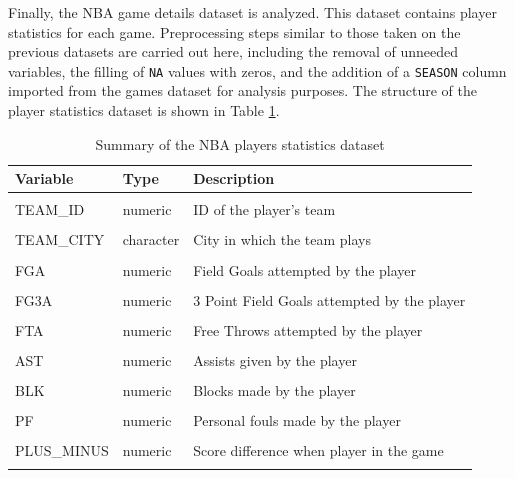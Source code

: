 \documentclass[
  12pt,
  a4paper,
]{article}
\begin{document}
Finally, the NBA game details dataset is analyzed. This dataset contains player statistics for each game. Preprocessing steps similar to those taken on the previous datasets are carried out here, including the removal of unneeded variables, the filling of \texttt{NA} values with zeros, and the addition of a \texttt{SEASON} column imported from the games dataset for analysis purposes. The structure of the player statistics dataset is shown in Table \ref{tab:gddesc}.

\begin{table}[H]

\caption{\label{tab:gddesc}Summary of the NBA players statistics dataset}
\centering
\begin{tabular}[t]{lll}
\toprule
Variable & Type & Description\\
\midrule
\cellcolor{gray!30}{GAME\_ID} & \cellcolor{gray!30}{numeric} & \cellcolor{gray!30}{NBA's game ID in their API}\\
TEAM\_ID & numeric & ID of the player's team\\
\cellcolor{gray!30}{TEAM\_ABBREVIATION} & \cellcolor{gray!30}{character} & \cellcolor{gray!30}{3-letter abbreviation of the team name}\\
TEAM\_CITY & character & City in which the team plays\\
\cellcolor{gray!30}{FGM} & \cellcolor{gray!30}{numeric} & \cellcolor{gray!30}{Field Goals made by the player}\\
FGA & numeric & Field Goals attempted by the player\\
\cellcolor{gray!30}{FG3M} & \cellcolor{gray!30}{numeric} & \cellcolor{gray!30}{3 Point Field Goals made by the player}\\
FG3A & numeric & 3 Point Field Goals attempted by the player\\
\cellcolor{gray!30}{FTM} & \cellcolor{gray!30}{numeric} & \cellcolor{gray!30}{Free Throws made by the player}\\
FTA & numeric & Free Throws attempted by the player\\
\cellcolor{gray!30}{REB} & \cellcolor{gray!30}{numeric} & \cellcolor{gray!30}{Rebounds taken by the player}\\
AST & numeric & Assists given by the player\\
\cellcolor{gray!30}{STL} & \cellcolor{gray!30}{numeric} & \cellcolor{gray!30}{Steals made by the player}\\
BLK & numeric & Blocks made by the player\\
\cellcolor{gray!30}{TO} & \cellcolor{gray!30}{numeric} & \cellcolor{gray!30}{Turnovers made by the player}\\
PF & numeric & Personal fouls made by the player\\
\cellcolor{gray!30}{PTS} & \cellcolor{gray!30}{numeric} & \cellcolor{gray!30}{Total points scored by the player}\\
PLUS\_MINUS & numeric & Score difference when player in the game\\
\cellcolor{gray!30}{SEASON} & \cellcolor{gray!30}{numeric} & \cellcolor{gray!30}{Season indicator}\\
\bottomrule
\end{tabular}
\end{table}
\end{document}
